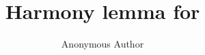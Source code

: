 \documentclass[runningheads,orivec]{llncs}
\title{Harmony lemma for \lqCCS}
\author{Anonymous Author}
\institute{Anonymous Institution}
\newif\ifshowappendix%
\begin{document}
\maketitle

\begin{abstract}
\end{abstract}

\appendix
\ifshowappendix%


\fi

\end{document}
